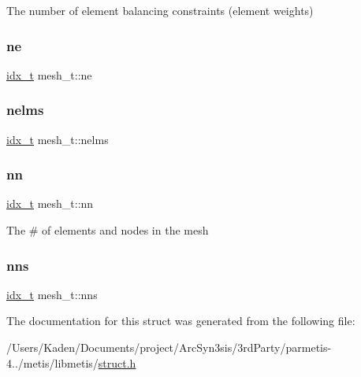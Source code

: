 The number of element balancing constraints (element weights) \mbox{\label{a00738_ac33c0c0c59858834a11754492189e231}} 
\subsubsection{\texorpdfstring{ne}{ne}}
{\footnotesize\ttfamily \hyperlink{a00876_aaa5262be3e700770163401acb0150f52}{idx\+\_\+t} mesh\+\_\+t\+::ne}

\mbox{\label{a00738_ad2c11f70ee4b511bd158dbd38f46fc14}} 
\subsubsection{\texorpdfstring{nelms}{nelms}}
{\footnotesize\ttfamily \hyperlink{a00876_aaa5262be3e700770163401acb0150f52}{idx\+\_\+t} mesh\+\_\+t\+::nelms}

\mbox{\label{a00738_a6321957b37b2040997c84db2fd2b8427}} 
\subsubsection{\texorpdfstring{nn}{nn}}
{\footnotesize\ttfamily \hyperlink{a00876_aaa5262be3e700770163401acb0150f52}{idx\+\_\+t} mesh\+\_\+t\+::nn}

The \# of elements and nodes in the mesh \mbox{\label{a00738_abf9cfafc4af9ca5ac76785bc2c849780}} 
\subsubsection{\texorpdfstring{nns}{nns}}
{\footnotesize\ttfamily \hyperlink{a00876_aaa5262be3e700770163401acb0150f52}{idx\+\_\+t} mesh\+\_\+t\+::nns}



The documentation for this struct was generated from the following file\+:\begin{DoxyCompactItemize}
\item 
/\+Users/\+Kaden/\+Documents/project/\+Arc\+Syn3sis/3rd\+Party/parmetis-\/4../metis/libmetis/\hyperlink{a00972}{struct.\+h}\end{DoxyCompactItemize}
